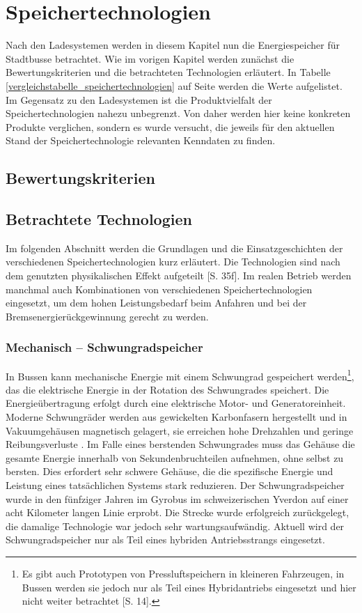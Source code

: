 \chapter{Speichertechnologien} %
Nach den Ladesystemen werden in diesem Kapitel nun die Energiespeicher für Stadtbusse betrachtet. Wie im vorigen Kapitel werden zunächst die Bewertungskriterien und die betrachteten Technologien erläutert. In Tabelle \ref{vergleichstabelle_speichertechnologien} auf Seite \pageref{vergleichstabelle_speichertechnologien} werden die Werte aufgelistet.\\
Im Gegensatz zu den Ladesystemen ist die Produktvielfalt der Speichertechnologien nahezu unbegrenzt. Von daher werden hier keine konkreten Produkte verglichen, sondern es wurde versucht, die jeweils für den aktuellen Stand der Speichertechnologie relevanten Kenndaten zu finden.
\section{Bewertungskriterien} %
\section{Betrachtete Technologien}
Im folgenden Abschnitt werden die Grundlagen und die Einsatzgeschichten der verschiedenen Speichertechnologien kurz erläutert. Die Technologien sind nach dem genutzten physikalischen Effekt aufgeteilt \cite{Sterner:2014}[S. 35f]. Im realen Betrieb werden manchmal auch Kombinationen von verschiedenen Speichertechnologien eingesetzt, um dem hohen Leistungsbedarf beim Anfahren und bei der Bremsenergierückgewinnung gerecht zu werden.
\subsection{Mechanisch – Schwungradspeicher} %
In Bussen kann mechanische Energie mit einem Schwungrad gespeichert werden\footnote{Es gibt auch Prototypen von Pressluftspeichern in kleineren Fahrzeugen, in Bussen werden sie jedoch nur als Teil eines Hybridantriebs eingesetzt und hier nicht weiter betrachtet \cite{Sebastian-Naumann:2014}[S. 14].}, das die elektrische Energie in der Rotation des Schwungrades speichert. Die Energieübertragung erfolgt durch eine elektrische Motor- und Generatoreinheit. Moderne Schwungräder werden aus gewickelten Karbonfasern hergestellt und in Vakuumgehäusen magnetisch gelagert, sie erreichen hohe Drehzahlen und geringe Reibungsverluste \cite{993788}. Im Falle eines berstenden Schwungrades muss das Gehäuse die gesamte Energie innerhalb von Sekundenbruchteilen aufnehmen, ohne selbst zu bersten. Dies erfordert sehr schwere Gehäuse, die die spezifische Energie und Leistung eines tatsächlichen Systems stark reduzieren. Der Schwungradspeicher wurde in den fünfziger Jahren im Gyrobus im schweizerischen Yverdon auf einer acht Kilometer langen Linie erprobt. Die Strecke wurde erfolgreich zurückgelegt, die damalige Technologie war jedoch sehr wartungsaufwändig. Aktuell wird der Schwungradspeicher nur als Teil eines hybriden Antriebsstrangs eingesetzt.
